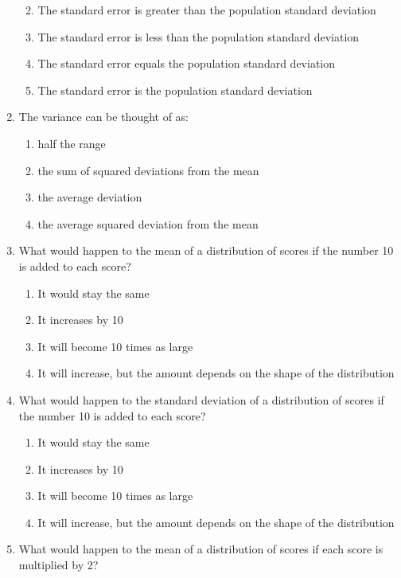 \documentclass[]{article}
\begin{document}
\begin{enumerate}
  \begin{enumerate}
  \def\labelenumii{\alph{enumii}.}
  \item
    The standard error is greater than the population standard deviation
  \item
    The standard error is less than the population standard deviation
  \item
    The standard error equals the population standard deviation
  \item
    The standard error is the population standard deviation
  \end{enumerate}
\item
  The variance can be thought of as:

  \begin{enumerate}
  \def\labelenumii{\alph{enumii}.}
  \item
    half the range
  \item
    the sum of squared deviations from the mean
  \item
    the average deviation
  \item
    the average squared deviation from the mean
  \end{enumerate}
\item
  What would happen to the mean of a distribution of scores if the
  number 10 is added to each score?

  \begin{enumerate}
  \def\labelenumii{\alph{enumii}.}
  \item
    It would stay the same
  \item
    It increases by 10
  \item
    It will become 10 times as large
  \item
    It will increase, but the amount depends on the shape of the
    distribution
  \end{enumerate}
\item
  What would happen to the standard deviation of a distribution of
  scores if the number 10 is added to each score?

  \begin{enumerate}
  \def\labelenumii{\alph{enumii}.}
  \item
    It would stay the same
  \item
    It increases by 10
  \item
    It will become 10 times as large
  \item
    It will increase, but the amount depends on the shape of the
    distribution
  \end{enumerate}
\item
  What would happen to the mean of a distribution of scores if each
  score is multiplied by 2?


\end{enumerate}
\end{document}
